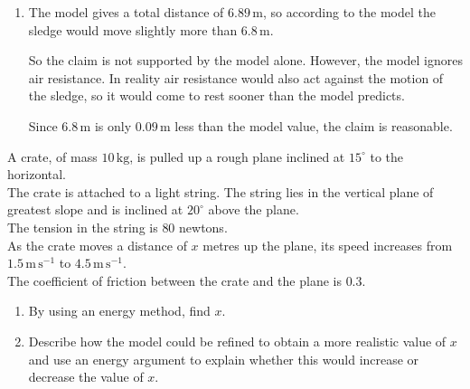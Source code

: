 \documentclass[leqno]{article}
\begin{document}
\begin{enumerate}[
  label=\textbf{\arabic*.},
  leftmargin=*,
  topsep=0pt,
  partopsep=0pt,
  parsep=0pt
]
\begin{djsSolution}
\begin{enumerate}[label=\textbf{(\alph*)}]
  Hence
  \[
  s=\frac{310.8}{40(9.8)(\sin 10^\circ+0.25\cos 10^\circ)} \approx 1.89
  \]

  So the total distance moved up the slope is
  \[
  5+1.89=6.89\,\mathrm{m}
  \]

  \item The model gives a total distance of \(6.89\,\mathrm{m}\), so according to the model the sledge would move slightly more than \(6.8\,\mathrm{m}\).

  So the claim is not supported by the model alone. However, the model ignores air resistance. In reality air resistance would also act against the motion of the sledge, so it would come to rest sooner than the model predicts.

  Since \(6.8\,\mathrm{m}\) is only \(0.09\,\mathrm{m}\) less than the model value, the claim is reasonable.
\end{enumerate}
\end{djsSolution}


\newpage

\questionitem


A crate, of mass $10\,\mathrm{kg}$, is pulled up a rough plane inclined at $15^\circ$ to the horizontal. \\

The crate is attached to a light string. The string lies in the vertical plane of greatest slope and is inclined at $20^\circ$ above the plane. \\

The tension in the string is $80$ newtons. \\

As the crate moves a distance of $x$ metres up the plane, its speed increases from $1.5\,\mathrm{m\,s^{-1}}$ to $4.5\,\mathrm{m\,s^{-1}}$. \\

The coefficient of friction between the crate and the plane is $0.3$. \\

\begin{enumerate}[label=\textbf{(\alph*)}]
  \item By using an energy method, find $x$.  \\
  \item Describe how the model could be refined to obtain a more realistic value of $x$ and use an energy argument to explain whether this would increase or decrease the value of $x$.  \\
\end{enumerate}


\end{enumerate}
\end{document}
